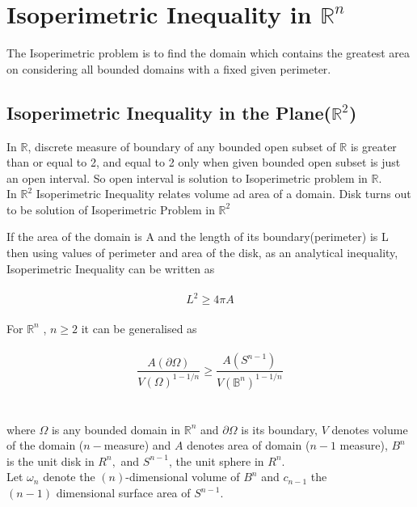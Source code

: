 \documentclass[oneside]{book}
\begin{document}
	
	
	
	
	
	
	
	
	
	
	
	
	
	
	
	
	
	
	
	
	\chapter{Isoperimetric Inequality in $\mathbb{R}^{n}$} 
	The Isoperimetric problem is to find the domain which contains the greatest area on considering all bounded domains with a fixed given perimeter.
	
	
	
	
	
	\section{\textbf{Isoperimetric Inequality in the Plane($\mathbb{R}^{2}$)}}
	\label{s:2}
	In $\mathbb{R}$, discrete measure of boundary of any bounded open subset of $\mathbb{R}$ is greater than or equal to 2, and equal to 2 only when given bounded open subset is just an open interval. So open interval is solution to Isoperimetric problem in $\mathbb{R}$.\\
	In $\mathbb{R}^{2}$ Isoperimetric Inequality relates volume ad area of a domain. Disk turns out to be solution of Isoperimetric Problem in $\mathbb{R}^{2}$   
	
	If the area of the domain is A and the length of its boundary(perimeter) is L then using values of perimeter and area of the disk,
	as an analytical inequality, Isoperimetric Inequality can be written as \\\\
	\begin{equation}
	\label{eq5}  
	L^{2} \geq 4 \pi A
	\end{equation}
	\\
	For $\mathbb{R}^{n}$ 
	, $n \geq 2$  it can be generalised as
	\\\\
	\begin{equation}
	\label{eq6}  
	\frac{A(\partial \Omega)}{V(\Omega)^{1-1 / n}} \geq \frac{A\left(S^{n-1}\right)}{V\left(\mathbb{B}^{n}\right)^{1-1 / n}}
	\end{equation} \\\\
	where $\Omega$ is any bounded domain in $\mathbb{R}^{n}$ and $\partial \Omega$ is its boundary, $V$ denotes volume of the domain ($n-$measure) and $A$ denotes area of domain ($n-1$ measure), $B^{n}$ is the unit disk in $R^{n},$ and $S^{n-1}$,
	the unit sphere in $R^{n}$.
	\\
	Let $\omega_{n}$ denote the $(n)$-dimensional volume of $B^{n}$ and  $c_{n-1}$ the \\ $(n-1)$ dimensional surface area of $S^{n-1}$. \\
	
\end{document}

